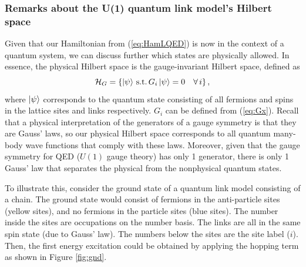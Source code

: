 \documentclass[a4paper]{report}
\begin{document}
\begin{spacing}{1.1}

\subsubsection{Remarks about the U(1) quantum link model's Hilbert space}

Given that our Hamiltonian from (\ref{eq:HamLQED}) is now in the context of a quantum system, we can discuss further which states are physically allowed. In essence, the physical Hilbert space is the gauge-invariant Hilbert space, defined as
\begin{equation}
    \mathcal{H}_G = \left\{ \ket{\psi}\, \text{s.t.}\, G_i\ket{\psi} = 0 \quad \forall\, i \right\},
\end{equation}
where $\ket{\psi}$ corresponds to the quantum state consisting of all fermions and spins in the lattice sites and links respectively. $G_i$ can be defined from (\ref{eq:Gx}). Recall that a physical interpretation of the generators of a gauge symmetry is that they are Gauss' laws, so our physical Hilbert space corresponds to all quantum many-body wave functions that comply with these laws. Moreover, given that the gauge symmetry for QED ($U(1)$ gauge theory) has only 1 generator, there is only 1 Gauss' law that separates the physical from the nonphysical quantum states.


To illustrate this, consider the ground state of a quantum link model consisting of a chain. The ground state would consist of fermions in the anti-particle sites (yellow sites), and no fermions in the particle sites (blue sites). The number inside the sites are occupations on the number basis. The links are all in the same spin state (due to Gauss' law). The numbers below the sites are the site label ($i$). Then, the first energy excitation could be obtained by applying the hopping term as shown in Figure \ref{fig:gnd}.


\end{spacing}
\end{document}
